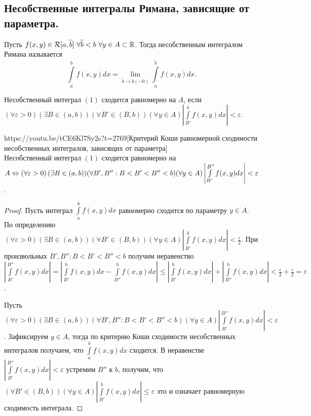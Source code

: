 \subsection{Несобственные интегралы Римана, зависящие от параметра.}

Пусть $f(x,y)\in \mathcal{R}[a,\widetilde{b}]\ \forall\widetilde{b}<b\ \forall y\in A\subset \mathbb{R}$. Тогда несобственным интегралом Римана называется
\begin{equation}
	\int\limits_a^b f(x,y)dx=\lim\limits_{\widetilde{b}\to b(-0)}\int\limits_a^{\widetilde{b}} f(x,y)dx.
\end{equation}
\begin{Def}
	Несобственный интеграл $(1)$ сходится равномерно на $A$, если $(\forall\varepsilon>0)(\exists B\in(a,b))(\forall B'\in(B,b))(\forall y\in A)\left|\int\limits_{B'}^b f(x,y)dx\right|<\varepsilon$.
\end{Def}

\begin{linkthm}{https://youtu.be/tCE6Kl7Sy2s?t=2769}[Критерий Коши равномерной сходимости несобственных интегралов, зависящих от параметра]\ \\
	Несобственный интеграл $(1)$ сходится равномерно на $A\Leftrightarrow \left(\forall\varepsilon>0\right)(\exists B\in(a,b))(\forall B', B'':\\ B<B'<B''<b)(\forall y\in A)\left|\int\limits_{B'}^{B''}f(x,y)dx\right|<\varepsilon$.
\end{linkthm} 
\begin{proof}
	Пусть интеграл $\int\limits_a^bf(x,y)dx$ равномерно сходится по параметру $y\in A$. По определению $(\forall\varepsilon>0)(\exists B\in(a,b))(\forall B'\in(B,b))(\forall y\in A)\left|\int\limits_{B'}^b f(x,y)dx\right|<\frac{\varepsilon}{2}$. При произвольных $B', B'':B<B'<B''<b$ получим неравенство $\left|\int\limits_{B'}^{B''}f(x,y)dx\right|=\left|\int\limits_{B'}^bf(x,y)dx-\int\limits_{B''}^bf(x,y)dx\right|\leqslant \left|\int\limits_{B'}^bf(x,y)dx\right|+\left|\int\limits_{B''}^bf(x,y)dx\right|<\frac{\varepsilon}{2}+\frac{\varepsilon}{2}=\varepsilon$.
	
	Пусть $\left(\forall\varepsilon>0\right)(\exists B\in(a,b))(\forall B', B'': B<B'<B''<b)(\forall y\in A)\left|\int\limits_{B'}^{B''}f(x,y)dx\right|<\varepsilon$. Зафиксируем $y\in A$, тогда по критерию Коши сходимости несобственных интегралов получаем, что $\int\limits_a^bf(x,y)dx$ сходится. В неравенстве $\left|\int\limits_{B'}^{B''}f(x,y)dx\right|<\varepsilon$ устремим $B''$ к $b$, получим, что $(\forall B'\in(B,b))(\forall y\in A)\left|\int\limits_{B'}^{b}f(x,y)dx\right|\leqslant\varepsilon$ это и означает равномерную сходимость интеграла.
\end{proof}

